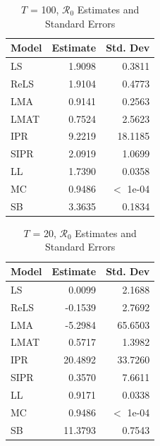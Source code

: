 \documentclass[12pt]{article}
\newcommand{\rr}{\ensuremath{\mathcal{R}_0}}
\begin{document}
\begin{table}[H]
	
	
	\centering
	\begin{tabular}[t]{l|r|r}
		\hline
		Model & Estimate & Std. Dev\\
		\hline
		LS & 1.9098 & 0.3811\\
		\hline
		ReLS & 1.9104 & 0.4773\\
		\hline
		LMA & 0.9141 & 0.2563\\
		\hline
		LMAT & 0.7524 & 2.5623\\
		\hline
		IPR & 9.2219 & 18.1185\\
		\hline
		SIPR & 2.0919 & 1.0699\\
		\hline
		LL & 1.7390 & 0.0358\\
		\hline
		MC & 0.9486 & $<$ 1e-04\\
		\hline
		SB & 3.3635 & 0.1834\\
		\hline
	\end{tabular}
	\caption{ $T$ = 100, $\rr$ Estimates and Standard Errors}
\end{table}

\begin{table}[H]
	\centering
	\begin{tabular}[t]{l|r|r}
		\hline
		Model & Estimate & Std. Dev\\
		\hline
		LS & 0.0099 & 2.1688\\
		\hline
		ReLS & -0.1539 & 2.7692\\
		\hline
		LMA & -5.2984 & 65.6503\\
		\hline
		LMAT & 0.5717 & 1.3982\\
		\hline
		IPR & 20.4892 & 33.7260\\
		\hline
		SIPR & 0.3570 & 7.6611\\
		\hline
		LL & 0.9171 & 0.0338\\
		\hline
		MC & 0.9486 & $<$ 1e-04\\
		\hline
		SB & 11.3793 & 0.7543\\
		\hline
	\end{tabular}
	\caption{$T$ = 20, $\rr$ Estimates and Standard Errors}
\end{table}
\end{document}
